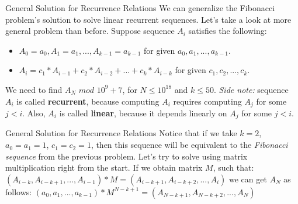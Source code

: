 \documentclass{beamer}
\begin{document}
\begin{frame}{General Solution for Recurrence Relations}
  We can generalize the Fibonacci problem's solution to solve linear recurrent sequences.
  \pause \newline
  Let's take a look at more general problem than before. Suppose sequence $A_i$ satisfies the following:
  \begin{itemize}
    \item $A_0 = a_0, A_1 = a_1, ..., A_{k-1} = a_{k-1}$ for given $a_0, a_1, ..., a_{k-1}$.
      \pause
    \item $A_i = c_1 * A_{i-1} + c_2 * A_{i-2} + ... + c_k * A_{i-k}$ for given $c_1, c_2, ..., c_k$.      
  \end{itemize}
  \pause
  We need to find $A_N$ $mod$ $10^9 + 7$, for $N \leq 10^{18}$ and $k \leq 50$.
  \pause \newline \newline
  \textit{Side note:} sequence $A_i$ is called \textbf{recurrent}, because computing $A_i$
  requires computing $A_j$ for some $j < i$. Also, $A_i$ is called \textbf{linear},
  because it depends linearly on $A_j$ for some $j < i$.
\end{frame}

\begin{frame}{General Solution for Recurrence Relations}
  Notice that if we take $k = 2$, $a_0 = a_1 = 1$, $c_1 = c_2 = 1$, then this
  sequence will be equivalent to the \textit{Fibonacci sequence} from the previous problem.
  \pause \newline
  Let's try to solve using matrix multiplication right from the start.
  \newline
  If we obtain matrix $M$, such that:
  \newline
  $(A_{i-k}, A_{i-k+1}, ..., A_{i-1}) * M = (A_{i-k+1}, A_{i-k+2}, ..., A_i)$
  \pause \newline
  we can get $A_N$ as follows:
  \newline
  $(a_0, a_1, ..., a_{k-1}) * M^{N-k+1} = (A_{N-k+1}, A_{N-k+2}, ..., A_N)$
\end{frame}
\end{document}
